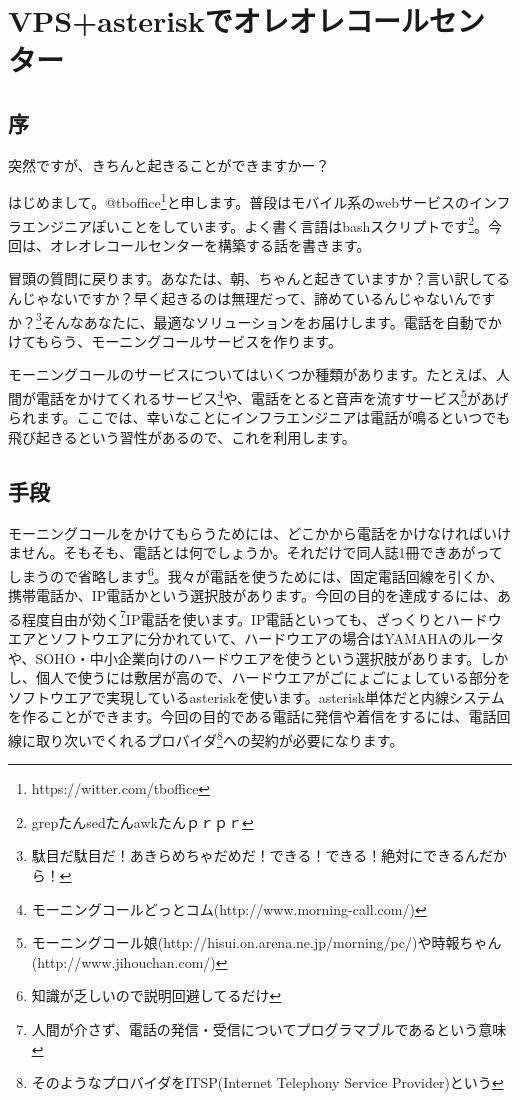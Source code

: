 \section{VPS+asteriskでオレオレコールセンター}
\subsection{序}

\begin{screen}
\begin{center}
突然ですが、きちんと起きることができますかー？
\end{center}
\end{screen}

はじめまして。@tboffice\footnote{https://witter.com/tboffice}と申します。普段はモバイル系のwebサービスのインフラエンジニアぽいことをしています。よく書く言語はbashスクリプトです\footnote{grepたんsedたんawkたんｐｒｐｒ}。今回は、オレオレコールセンターを構築する話を書きます。

冒頭の質問に戻ります。あなたは、朝、ちゃんと起きていますか？言い訳してるんじゃないですか？早く起きるのは無理だって、諦めているんじゃないんですか？\footnote{駄目だ駄目だ！あきらめちゃだめだ！できる！できる！絶対にできるんだから！}そんなあなたに、最適なソリューションをお届けします。電話を自動でかけてもらう、モーニングコールサービスを作ります。

モーニングコールのサービスについてはいくつか種類があります。たとえば、人間が電話をかけてくれるサービス\footnote{モーニングコールどっとコム(http://www.morning-call.com/)}や、電話をとると音声を流すサービス\footnote{モーニングコール娘(http://hisui.on.arena.ne.jp/morning/pc/)や時報ちゃん(http://www.jihouchan.com/)}があげられます。ここでは、幸いなことにインフラエンジニアは電話が鳴るといつでも飛び起きるという習性があるので、これを利用します。

\subsection{手段}
モーニングコールをかけてもらうためには、どこかから電話をかけなければいけません。そもそも、電話とは何でしょうか。それだけで同人誌1冊できあがってしまうので省略します\footnote{知識が乏しいので説明回避してるだけ}。我々が電話を使うためには、固定電話回線を引くか、携帯電話か、IP電話かという選択肢があります。今回の目的を達成するには、ある程度自由が効く\footnote{人間が介さず、電話の発信・受信についてプログラマブルであるという意味}IP電話を使います。IP電話といっても、ざっくりとハードウエアとソフトウエアに分かれていて、ハードウエアの場合はYAMAHAのルータや、SOHO・中小企業向けのハードウエアを使うという選択肢があります。しかし、個人で使うには敷居が高ので、ハードウエアがごにょごにょしている部分をソフトウエアで実現しているasteriskを使います。asterisk単体だと内線システムを作ることができます。今回の目的である電話に発信や着信をするには、電話回線に取り次いでくれるプロバイダ\footnote{そのようなプロバイダをITSP(Internet Telephony Service Provider)という}への契約が必要になります。

